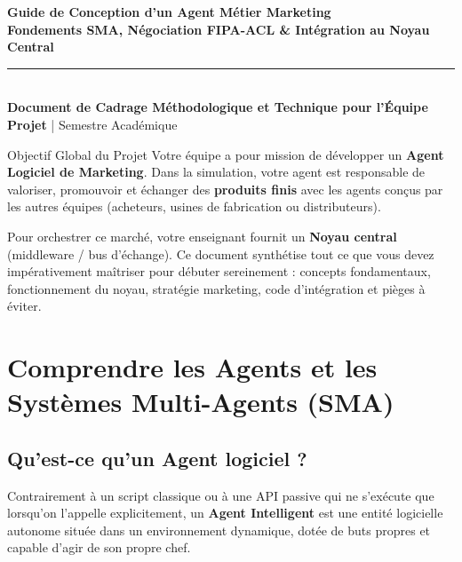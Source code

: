 \documentclass[11pt,a4paper]{article}
\begin{document}
\begin{center}
    {\LARGE \textbf{\color{primary}Guide de Conception d'un Agent Métier Marketing}}\\[0.15cm]
    {\large \textbf{\color{secondary}Fondements SMA, Négociation FIPA-ACL \& Intégration au Noyau Central}}\\[0.25cm]
    \rule{0.85\textwidth}{0.8pt}\\[0.15cm]
    {\footnotesize \textbf{Document de Cadrage Méthodologique et Technique pour l'Équipe Projet} | Semestre Académique}
\end{center}
\vspace{-0.25cm}

\begin{conceptbox}{Objectif Global du Projet}
Votre équipe a pour mission de développer un \textbf{Agent Logiciel de Marketing}. Dans la simulation, votre agent est responsable de valoriser, promouvoir et échanger des \textbf{produits finis} avec les agents conçus par les autres équipes (acheteurs, usines de fabrication ou distributeurs).

Pour orchestrer ce marché, votre enseignant fournit un \textbf{Noyau central} (middleware / bus d'échange). Ce document synthétise tout ce que vous devez impérativement maîtriser pour débuter sereinement : concepts fondamentaux, fonctionnement du noyau, stratégie marketing, code d'intégration et pièges à éviter.
\end{conceptbox}

\section{Comprendre les Agents et les Systèmes Multi-Agents (SMA)}

\subsection{Qu'est-ce qu'un Agent logiciel ?}
Contrairement à un script classique ou à une API passive qui ne s'exécute que lorsqu'on l'appelle explicitement, un \textbf{Agent Intelligent} est une entité logicielle autonome située dans un environnement dynamique, dotée de buts propres et capable d'agir de son propre chef.
\end{document}
